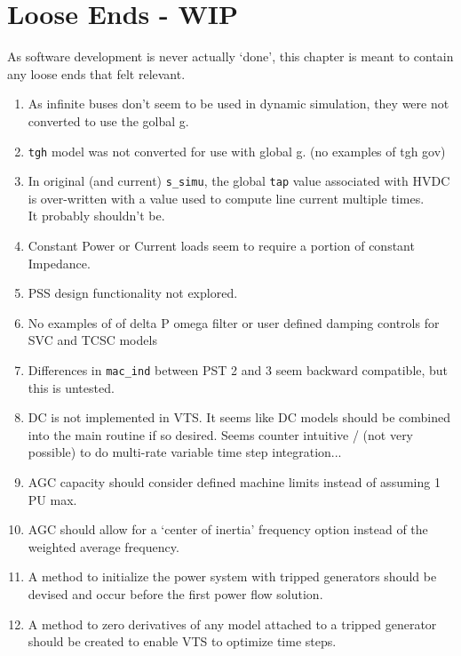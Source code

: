 \chapter{Loose Ends - WIP}
As software development is never actually `done', this chapter is meant to contain any loose ends that felt relevant.

\begin{enumerate}
\singlespacing
	\item As infinite buses don't seem to be used in dynamic simulation, they were not converted to use the golbal g.
	\item \verb|tgh| model was not converted for use with global g. (no examples of tgh gov)
	\item In original (and current) \verb|s_simu|, the global \verb|tap| value associated with HVDC is over-written with  a value used to compute line current multiple times. \\It probably shouldn't be.
	\item Constant Power or Current loads seem to require a portion of constant Impedance.
	\item PSS design functionality not explored.
	\item No examples of of delta P omega filter or user defined damping controls for SVC and TCSC models
	\item Differences in \verb|mac_ind| between PST 2 and 3 seem backward compatible, but this is untested.
	\item DC is not implemented in VTS. It seems like DC models should be combined into the main routine if so desired. Seems counter intuitive / (not very possible) to do multi-rate variable time step integration...
	\item AGC capacity should consider defined machine limits instead of assuming 1 PU max.
	\item AGC should allow for a `center of inertia' frequency option instead of the weighted average frequency.
	\item A method to initialize the power system with tripped generators should be devised and occur before the first power flow solution.
	\item A method to zero derivatives of any model attached to a tripped generator should be created to enable VTS to optimize time steps.

\end{enumerate}

